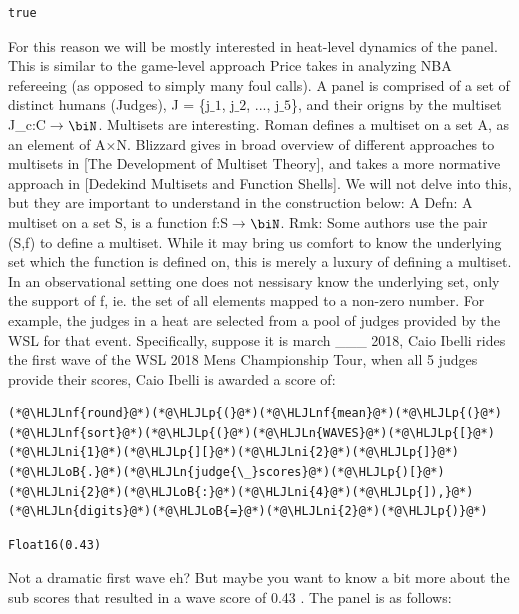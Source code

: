 \documentclass[12pt,a4paper]{article}
\newcommand{\HLJLn}[1]{#1}
\newcommand{\HLJLnf}[1]{\textcolor[RGB]{66,102,213}{#1}}
\newcommand{\HLJLni}[1]{\textcolor[RGB]{59,151,46}{#1}}
\newcommand{\HLJLoB}[1]{\textcolor[RGB]{102,102,102}{\textbf{#1}}}
\newcommand{\HLJLp}[1]{#1}
\begin{document}
\begin{lstlisting}
true
\end{lstlisting}


For this reason we will be mostly interested in heat-level dynamics of the panel. This is similar to the game-level approach Price takes in analyzing NBA refereeing (as opposed to simply many foul calls). A panel is comprised of a set of distinct humans (Judges), J = \{j\ensuremath{\_1}, j\ensuremath{\_2}, ..., j\ensuremath{\_5}\}, and their origns by the multiset J\_c:C\ensuremath{\rightarrow}\ensuremath{\biN}. Multisets are interesting. Roman defines a multiset on a set A, as an element of A\ensuremath{\times}N. Blizzard gives in broad overview of different approaches to multisets in [The Development of Multiset Theory], and takes a more normative approach in [Dedekind Multisets and Function Shells]. We will not delve into this, but they are important to understand in the construction below: A Defn: A multiset on a set S, is a function f:S\ensuremath{\rightarrow}\ensuremath{\biN}. Rmk: Some authors use the pair (S,f) to define a multiset. While it may bring us comfort to know the underlying set which the function is defined on, this is merely a luxury of defining a multiset. In an observational setting one does not nessisary know the underlying set, only the support of f, ie. the set of all elements mapped to a non-zero number. For example, the judges in a heat are selected from a pool of judges provided by the WSL for that event. Specifically, suppose it is march \_\_\_ 2018, Caio Ibelli rides the first wave of the WSL 2018 Mens Championship Tour, when all 5 judges provide their scores, Caio Ibelli is awarded a score of:


\begin{lstlisting}
(*@\HLJLnf{round}@*)(*@\HLJLp{(}@*)(*@\HLJLnf{mean}@*)(*@\HLJLp{(}@*)(*@\HLJLnf{sort}@*)(*@\HLJLp{(}@*)(*@\HLJLn{WAVES}@*)(*@\HLJLp{[}@*)(*@\HLJLni{1}@*)(*@\HLJLp{][}@*)(*@\HLJLni{2}@*)(*@\HLJLp{]}@*)(*@\HLJLoB{.}@*)(*@\HLJLn{judge{\_}scores}@*)(*@\HLJLp{)[}@*)(*@\HLJLni{2}@*)(*@\HLJLoB{:}@*)(*@\HLJLni{4}@*)(*@\HLJLp{]),}@*)(*@\HLJLn{digits}@*)(*@\HLJLoB{=}@*)(*@\HLJLni{2}@*)(*@\HLJLp{)}@*)
\end{lstlisting}

\begin{lstlisting}
Float16(0.43)
\end{lstlisting}


Not a dramatic first wave eh? But maybe you want to know a bit more about the sub scores that resulted in a wave score of 0.43 . The panel is as follows:
\end{document}
